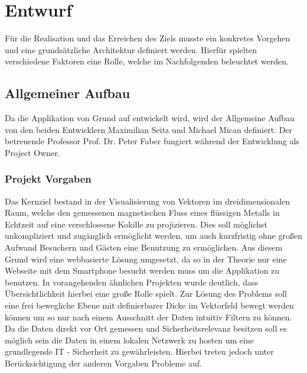 \section{Entwurf}
Für die Realisation und das Erreichen des Ziels musste ein konkretes Vorgehen und eine grundsätzliche Architektur definiert werden. Hierfür spielten verschiedene Faktoren eine Rolle, welche im Nachfolgenden beleuchtet werden.

\subsection{Allgemeiner Aufbau}
Da die Applikation von Grund auf entwickelt wird, wird der Allgemeine Aufbau von den beiden Entwicklern Maximilian Seitz und Michael Mican definiert. Der betreuende Professor Prof. Dr. Peter Faber fungiert während der Entwicklung als Project Owner.

\subsubsection{Projekt Vorgaben}
Das Kernziel bestand in der Visualisierung von Vektoren im dreidimensionalen Raum, welche den gemessenen magnetischen Fluss eines flüssigen Metalls in Echtzeit auf eine verschlossene Kokille zu projizieren. Dies soll möglichst unkompliziert und zugänglich ermöglicht werden, um auch kurzfristig ohne großen Aufwand Besuchern und Gästen eine Benutzung zu ermöglichen. Aus diesem Grund wird eine webbasierte Lösung umgesetzt, da so in der Theorie nur eine Webseite mit dem Smartphone besucht werden muss um die Applikation zu benutzen. In vorangehenden ähnlichen Projekten wurde deutlich, dass Übersichtlichkeit hierbei eine große Rolle spielt. Zur Lösung des Problems soll eine frei bewegliche Ebene mit definierbarer Dicke im Vektorfeld bewegt werden können um so nur nach einem Ausschnitt der Daten intuitiv Filtern zu können. Da die Daten direkt vor Ort gemessen und Sicherheitsrelevanz besitzen soll es möglich sein die Daten in einem lokalen Netzwerk zu hosten um eine grundlegende IT - Sicherheit zu gewährleisten. Hierbei treten jedoch unter Berücksichtigung der anderen Vorgaben Probleme auf.


%	
%	


